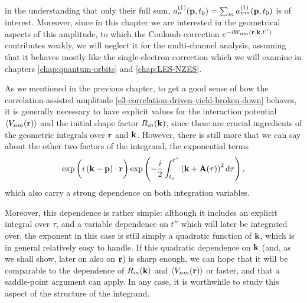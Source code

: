 in the understanding that only their full sum, $a_n^{(1)}(\vb{p},{t_0}) = \sum_m a_{nm}^{(1)}(\vb{p},{t_0})$ is of interest. Moreover, since in this chapter we are interested in the geometrical aspects of this amplitude, to which the Coulomb correction $e^{-iW_{nm}(\vb{r},\vb{k},t'')}$ contributes weakly, we will neglect it for the multi-channel analysis, assuming that it behaves mostly like the single-electron correction which we will examine in chapters \ref{chap:quantum-orbits} and \ref{chap:LES-NZES}.

As we mentioned in the previous chapter, to get a good sense of how the correlation-assisted amplitude \eqref{e3-correlation-driven-yield-broken-down} behaves, it is generally necessary to have explicit values for the interaction potential $\left\langle V_{nm}\mathopen{}\left( \vb{r} \right)\mathclose{} \right\rangle$ and the initial shape factor $R_m(\vb{k})$, since these are crucial ingredients of the geometric integrals over $\vb{r}$ and $\vb{k}$. However, there is still more that we can say about the other two factors of the integrand, the exponential terms
\begin{equation}
\exp\left(\vphantom{\int} i\left(\vb{k}-\vb{p}\right)\cdot\vb{r} \right)
\exp\left( -\frac{i}{2} \int_{{t_s}}^{t''}\left(\vb{k}+\vb{A}(\tau)\right)^2\mathrm{d}\tau \right)
,
\label{e3-exponential-factors}
\end{equation}
which also carry a strong dependence on both integration variables.

Moreover, this dependence is rather simple: although it includes an explicit integral over $\tau$, and a variable dependence on $t''$ which will later be integrated over, the exponent in this case is still simply a quadratic function of $\vb{k}$, which is in general relatively easy to handle. If this quadratic dependence on $\vb{k}$ (and, as we shall show, later on also on $\vb{r}$) is sharp enough, we can hope that it will be comparable to the dependence of $R_m(\vb{k})$ and $\left\langle V_{nm}\mathopen{}\left( \vb{r} \right)\mathclose{} \right\rangle$ or faster, and that a saddle-point argument can apply. In any case, it is worthwhile to study this aspect of the structure of the integrand.


